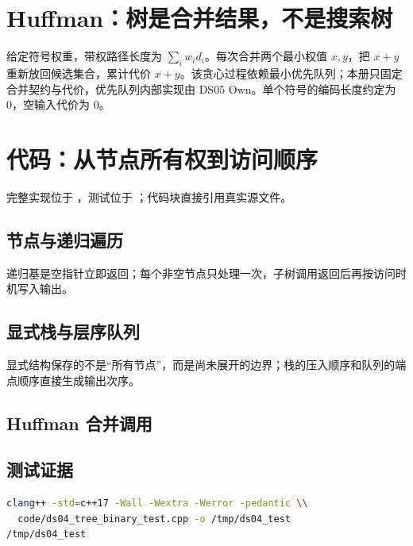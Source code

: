 \documentclass[UTF8,fontset=none,11pt,a4paper]{ctexart}
\begin{document}
\section{Huffman：树是合并结果，不是搜索树}
给定符号权重，带权路径长度为 $\sum_i w_i d_i$。每次合并两个最小权值 $x,y$，把 $x+y$ 重新放回候选集合，累计代价 $x+y$。该贪心过程依赖最小优先队列；本册只固定合并契约与代价，优先队列内部实现由 DS05 Own。单个符号的编码长度约定为 0，空输入代价为 0。

\section{代码：从节点所有权到访问顺序}
完整实现位于 ，测试位于 ；代码块直接引用真实源文件。
\subsection{节点与递归遍历}

递归基是空指针立即返回；每个非空节点只处理一次，子树调用返回后再按访问时机写入输出。
\subsection{显式栈与层序队列}

显式结构保存的不是“所有节点”，而是尚未展开的边界；栈的压入顺序和队列的端点顺序直接生成输出次序。
\subsection{Huffman 合并调用}

\subsection{测试证据}

\begin{lstlisting}[language=bash]
clang++ -std=c++17 -Wall -Wextra -Werror -pedantic \\
  code/ds04_tree_binary_test.cpp -o /tmp/ds04_test
/tmp/ds04_test
\end{lstlisting}
\end{document}
